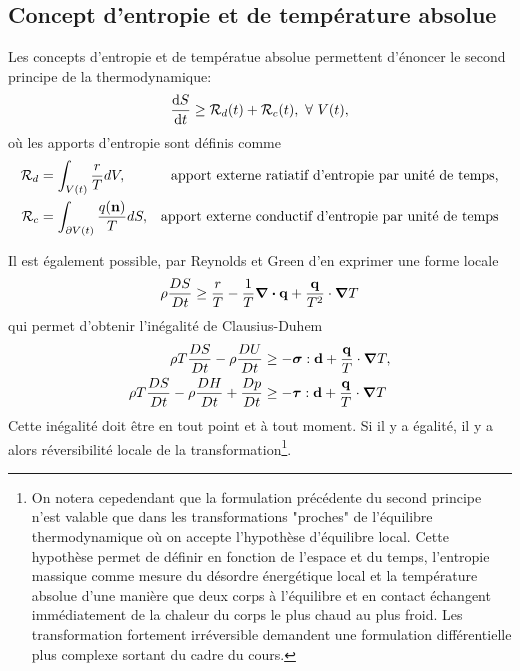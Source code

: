 \documentclass[a4paper,11pt]{report}
\newcommand{\bs}[1]{\boldsymbol{#1}}
\newcommand{\dvm}[2]{\frac{D #1}{D #2}}
\newcommand{\recip}[1]{\frac{1}{#1}}
\begin{document}
    \subsection{Concept d'entropie et de température absolue}
      Les concepts d'entropie et de températue absolue permettent d'énoncer le second principe de la thermodynamique:
      \begin{equation}
        \dv{S}{t} \geq \mathcal{R}_d(t) + \mathcal{R}_c(t),~\forall~V(t),
      \end{equation}
     où les apports d'entropie sont définis comme
     \begin{align*}
       \mathcal{R}_d &= \int_{V(t)} \frac{r}{T} dV, & \textrm{apport externe ratiatif d'entropie par unité de temps,}\\
       \mathcal{R}_c &= \int_{\partial V(t)} \frac{q(\vb{n})}{T}dS, & \textrm{apport externe conductif d'entropie par unité de temps}
     \end{align*}

     Il est également possible, par Reynolds et Green d'en exprimer une forme locale
     \begin{equation}
       \rho \dvm{S}{t} \geq \frac{r}{T} - \recip{T}\div \vb{q} + \frac{\vb{q}}{T^2} \cdot \grad T
     \end{equation}
     qui permet d'obtenir l'inégalité de Clausius-Duhem
     \begin{equation}
       \begin{aligned}
         \rho T \dvm{S}{t} - \rho \dvm{U}{t} &\geq - \bs{\sigma} : \vb{d} + \frac{\vb{q}}{T} \cdot \grad T,\\
         \rho T \dvm{S}{t} - \rho \dvm{H}{t} + \dvm{p}{t} &\geq - \bs{\tau} : \vb{d} + \frac{\vb{q}}{T} \cdot \grad T
       \end{aligned}
     \end{equation}
     Cette inégalité doit être en tout point et à tout moment. Si il y a égalité, il y a alors réversibilité locale de la transformation\footnote{On notera cepedendant que la formulation précédente du second principe n'est valable que dans les transformations "proches" de l'équilibre thermodynamique où on accepte l'hypothèse d'équilibre local. Cette hypothèse permet de définir en fonction de l'espace et du temps, l'entropie massique comme mesure du désordre énergétique local et la température absolue d'une manière que deux corps à l'équilibre et en contact échangent immédiatement de la chaleur du corps le plus chaud au plus froid. Les transformation fortement irréversible demandent une formulation différentielle plus complexe sortant du cadre du cours.}.
\end{document}
